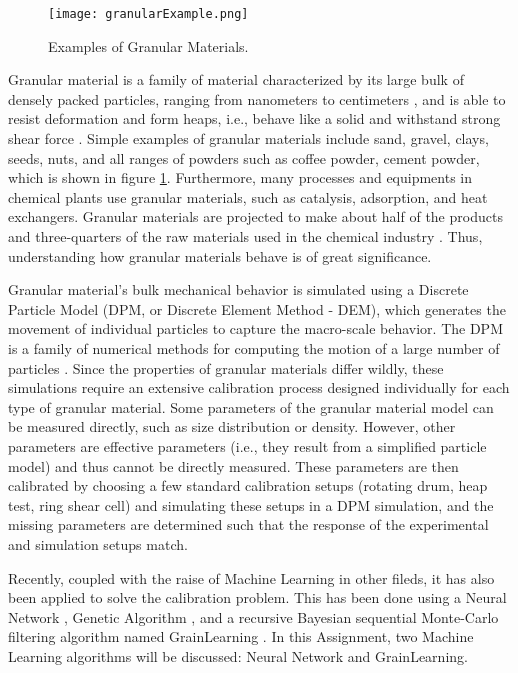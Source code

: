 \documentclass[../BachelorAssignment.tex]{subfiles}
\begin{document}
\graphicspath{{\subfix{../Images/}}}

\begin{figure}[H]
    \centering
    \texttt{[image: granularExample.png]}
    \caption{Examples of Granular Materials.\cite{granularExample}}
    \label{fig:granularExample}
\end{figure}


Granular material is a family of material characterized by its large bulk of densely packed particles, ranging from nanometers to centimeters \cite{introGranular2}, and is able to resist deformation and form heaps, i.e., behave like a solid and withstand strong shear force \cite{introGranular3}. Simple examples of granular materials include sand, gravel, clays, seeds, nuts, and all ranges of powders such as coffee powder, cement powder, which is shown in figure \ref{fig:granularExample}. Furthermore, many processes and equipments in chemical plants use granular materials, such as catalysis, adsorption, and heat exchangers. Granular materials are projected to make about half of the products and three-quarters of the raw materials used in the chemical industry \cite{introGranular}. Thus, understanding how granular materials behave is of great significance. 


Granular material's bulk mechanical behavior is simulated using a Discrete Particle Model (DPM, or Discrete Element Method - DEM), which generates the movement of individual particles to capture the macro-scale behavior. The DPM is a family of numerical methods for computing the motion of a large number of particles \cite{Weng:2015}. Since the properties of granular materials differ wildly, these simulations require an extensive calibration process designed individually for each type of granular material. Some parameters of the granular material model can be measured directly, such as size distribution or density. However, other parameters are effective parameters (i.e., they result from a simplified particle model) and thus cannot be directly measured. These parameters are then calibrated by choosing a few standard calibration setups (rotating drum, heap test, ring shear cell) and simulating these setups in a DPM simulation, and the missing parameters are determined such that the response of the experimental and simulation setups match. 


Recently, coupled with the raise of Machine Learning in other fileds, it has also been applied to solve the calibration problem. This has been done using a Neural Network \cite{nn-calibration, NN-GA, NN-coarse}, Genetic Algorithm \cite{ga-calibration}, and a recursive Bayesian sequential Monte-Carlo filtering algorithm named GrainLearning \cite{grainLearning}. In this Assignment, two Machine Learning algorithms will be discussed: Neural Network and GrainLearning. 
\end{document}
